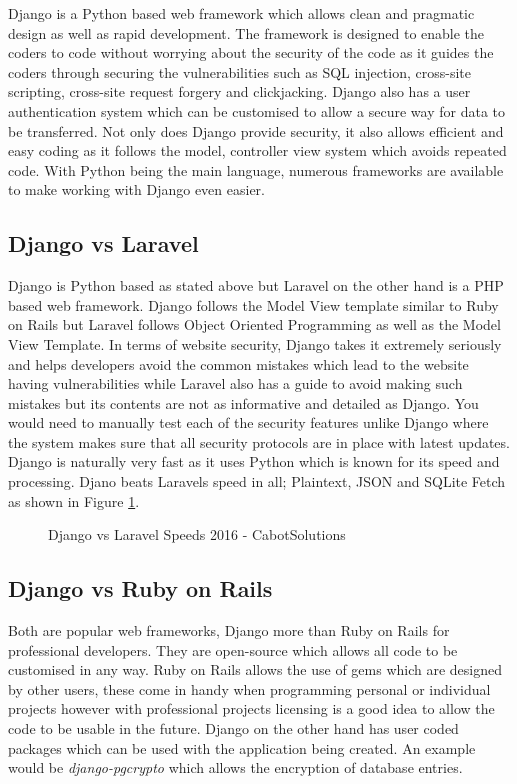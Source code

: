 \documentclass[../main.tex]{subfiles}
\begin{document}
\raggedright
Django is a Python based web framework which allows clean and pragmatic design as well as rapid development. The framework is designed to enable the coders to code without worrying about the security of the code as it guides the coders through securing the vulnerabilities such as SQL injection, cross-site scripting, cross-site request forgery and clickjacking. Django also has a user authentication system which can be customised to allow a secure way for data to be transferred\cite{django}. Not only does Django provide security, it also allows efficient and easy coding as it follows the model, controller view system which avoids repeated code. With Python being the main language, numerous frameworks are available to make working with Django even easier.\cite{whyusedjango} 

\subsection{Django vs Laravel}
Django is Python based as stated above but Laravel\cite{laravel} on the other hand is a PHP based web framework. Django follows the Model View template similar to Ruby on Rails but Laravel follows Object Oriented Programming as well as the Model View Template. In terms of website security, Django takes it extremely seriously and helps developers avoid the common mistakes which lead to the website having vulnerabilities while Laravel also has a guide to avoid making such mistakes but its contents are not as informative and detailed as Django. You would need to manually test each of the security features unlike Django where the system makes sure that all security protocols are in place with latest updates.
Django is naturally very fast as it uses Python which is known for its speed and processing. Djano beats Laravels speed in all; Plaintext, JSON and SQLite Fetch\cite{djangovslaravel} as shown in Figure \ref{fig:djangovslaravelsp}.

\begin{figure}[H]
        \caption{\label{fig:djangovslaravelsp} Django vs Laravel Speeds 2016 - CabotSolutions\cite{djangovslaravel}}
      \end{figure}
      
      
\subsection{Django vs Ruby on Rails} 
Both are popular web frameworks, Django more than Ruby on Rails for professional developers. They are open-source which allows all code to be customised in any way. Ruby on Rails allows the use of gems which are designed by other users, these come in handy when programming personal or individual projects however with professional projects licensing is a good idea to allow the code to be usable in the future\cite{djangovsrails}. Django on the other hand has user coded packages which can be used with the application being created. An example would be \textit{django-pgcrypto}\cite{dbencrypt} which allows the encryption of database entries. 
\end{document}
